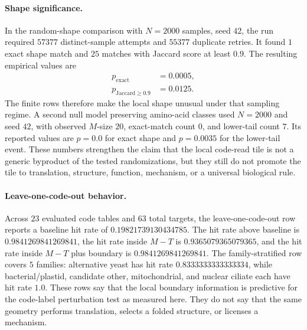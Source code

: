 \paragraph{Shape significance.}
In the random-shape comparison with $N=2000$ samples, seed $42$, the run required $57377$ distinct-sample attempts and $55377$ duplicate retries.  It found $1$ exact shape match and $25$ matches with Jaccard score at least $0.9$.  The resulting empirical values are
$$
\begin{aligned}
p_{\mathrm{exact}}&=0.0005,\\
p_{\mathrm{Jaccard}\geq 0.9}&=0.0125.
\end{aligned}
$$
The finite rows therefore make the local shape unusual under that sampling regime.  A second null model preserving amino-acid classes used $N=2000$ and seed $42$, with observed $M$-size $20$, exact-match count $0$, and lower-tail count $7$.  Its reported values are $p=0.0$ for exact shape and $p=0.0035$ for the lower-tail event.  These numbers strengthen the claim that the local code-read tile is not a generic byproduct of the tested randomizations, but they still do not promote the tile to translation, structure, function, mechanism, or a universal biological rule.

\paragraph{Leave-one-code-out behavior.}
Across $23$ evaluated code tables and $63$ total targets, the leave-one-code-out row reports a baseline hit rate of $0.19821739130434785$.  The hit rate above baseline is $0.9841269841269841$, the hit rate inside $M-T$ is $0.9365079365079365$, and the hit rate inside $M-T$ plus boundary is $0.9841269841269841$.  The family-stratified row covers $5$ families: alternative yeast has hit rate $0.8333333333333334$, while bacterial/plastid, candidate other, mitochondrial, and nuclear ciliate each have hit rate $1.0$.  These rows say that the local boundary information is predictive for the code-label perturbation test as measured here.  They do not say that the same geometry performs translation, selects a folded structure, or licenses a mechanism.

